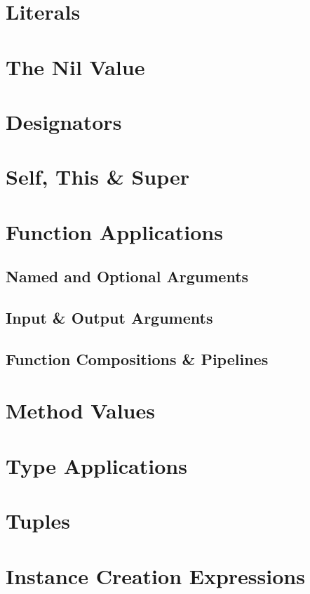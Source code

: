 \section{Literals}

\section{The Nil Value}

\section{Designators}

\section{Self, This \& Super}

\section{Function Applications}

\subsection{Named and Optional Arguments}

\subsection{Input \& Output Arguments}

\subsection{Function Compositions \& Pipelines}

\section{Method Values}

\section{Type Applications}

\section{Tuples}

\section{Instance Creation Expressions}

